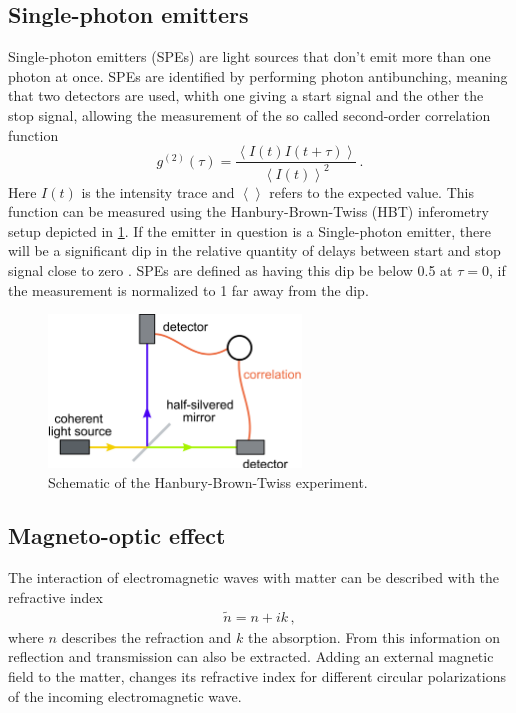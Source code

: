 \subsection{Single-photon emitters}
\label{sec:theory:spe}

Single-photon emitters (SPEs) are light sources that don't emit more than one photon at once.
SPEs are identified by performing photon antibunching, meaning that two detectors are used, whith one giving a start signal and the other the stop signal, allowing the measurement of the so called second-order correlation function
\begin{equation}
  g^{(2)}(\tau) = \frac{\left< I(t) I(t + \tau) \right>}{\left< I(t)\right> ^2} \,.
\end{equation}
Here $I(t)$ is the intensity trace and $\left< \right>$ refers to the expected value.
This function can be measured using the Hanbury-Brown-Twiss (HBT) inferometry setup depicted in \cref{fig_hbt}.
If the emitter in question is a Single-photon emitter, there will be a significant dip in the relative quantity of delays between start and stop signal close to zero \cite{tran2016}.
SPEs are defined as having this dip be below \SI{0.5}{} at $\tau = 0$, if the measurement is normalized to \SI{1}{} far away from the dip.

\begin{figure}[!ht]
    \centering
    \includegraphics[width=0.6\textwidth]{img/Correlation-interferometer}
    \caption{Schematic of the Hanbury-Brown-Twiss experiment. \cite{wikiHBT}}
    \label{fig_hbt}
\end{figure}

\subsection{Magneto-optic effect}

	The interaction of electromagnetic waves with matter can be described with the refractive index
	\begin{align*}
		\tilde{n} = n + ik \,,
	\end{align*}
	where $n$ describes the refraction and $k$ the absorption.
	From this information on reflection and transmission can also be extracted.
	Adding an external magnetic field to the matter, changes its refractive index for different circular polarizations of the incoming electromagnetic wave.

